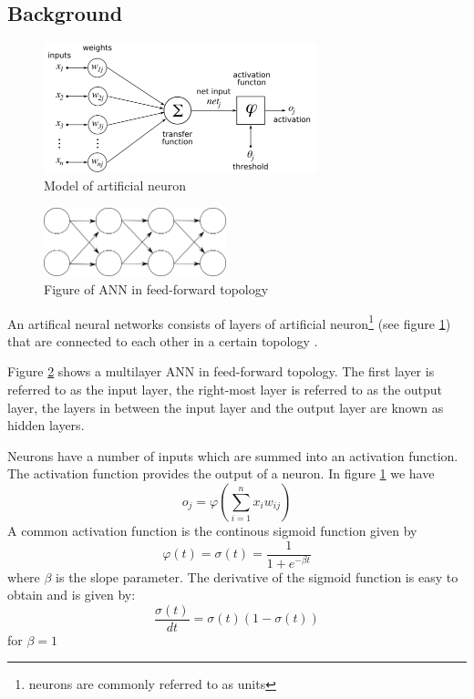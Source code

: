 \subsection{Background}
\begin{figure}
\includegraphics[width=300px]{../images/ANN_neuron.png}
\caption{Model of artificial neuron}
\label{ims:ANN_neuron}
\end{figure}
\begin{figure}
\centerline{\includegraphics[width=200px]{../images/ANN_feedforward.png}}
\caption{Figure of ANN in feed-forward topology}
\label{ims:ANN_FF}
\end{figure}
An artifical neural networks consists of layers of artificial neuron\footnote{neurons are commonly referred to as units} (see figure \ref{ims:ANN_neuron}) that are connected to each other in a certain topology \cite{bishop1995neural}.

Figure \ref{ims:ANN_FF} shows a multilayer ANN in feed-forward topology. The first layer is referred to as the input layer, the right-most layer is referred to as the output layer, the layers in between the input layer and the output layer are known as hidden layers.

Neurons have a number of inputs which are summed into an activation function. The activation function provides the output of a neuron.
In figure \ref{ims:ANN_neuron} we have
\[ o_j = \varphi(\sum^{n}_{i=1} x_i w_{ij})  \]
A common activation function is the continous sigmoid function given by
\begin{equation} \varphi(t) = \sigma(t) = \frac{1}{1+e^{-\beta t}}  \label{eq:sigmoid}\end{equation}
where $\beta$ is the slope parameter.
The derivative of the sigmoid function is easy to obtain and is given by:
\begin{equation} \frac{\sigma(t)}{dt} = \sigma(t)(1-\sigma(t))\label{eq:sigmoidd}\end{equation}
for $\beta=1$

